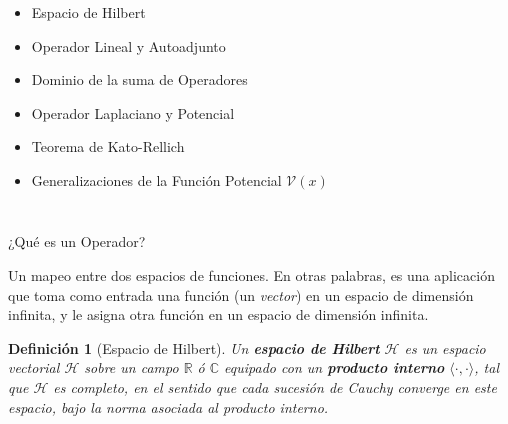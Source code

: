 \documentclass[aspectratio=1610]{beamer}
\newcommand*{\field}[1]{\mathbb{#1}}
\newtheorem*{defn}{Definición}
\begin{document}
\begin{frame}
\frametitle{ }
\begin{columns}
\column{37em}
\begin{itemize}\itemsep1em
  \justifying
  \item  \textcolor{Ocean}{Espacio de Hilbert} 
  \item  \textcolor{Ocean}{Operador Lineal y Autoadjunto} 
  \item  \textcolor{Ocean}{Dominio de la suma de Operadores} 
  \item  \textcolor{TextGreen}{Operador Laplaciano y Potencial}
  \item  \textcolor{TextGreen}{Teorema de Kato-Rellich}
  \item  \textcolor{TextGreen}{Generalizaciones de la Función Potencial $\mathcal{V}(x)$}
\end{itemize}
\end{columns}
\end{frame}



\begin{frame}{¿Qué es un Operador?}

Un mapeo entre dos espacios de funciones. En otras palabras, es una aplicación que toma como entrada una función (un \textit{vector}) en un espacio de dimensión infinita, y le asigna otra función en un espacio de dimensión infinita.

\vspace{0.1\textheight}

\begin{defn}[Espacio de Hilbert]
    Un \textbf{espacio de Hilbert} $\mathcal{H}$ es un espacio vectorial $\mathcal{H}$ sobre un campo $\field{R}$ ó $\field{C}$ equipado con un \textbf{producto interno} $\langle\cdot,\cdot \rangle$, tal que $\mathcal{H}$ es completo, en el sentido que cada sucesión de Cauchy converge en este espacio, bajo la norma asociada al producto interno.
\end{defn}
   
\begin{columns}
\column{37em}
\end{columns}
\end{frame}
\end{document}

